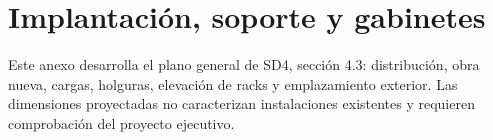 \renewcommand{\thechapter}{A4.4}
\chapter{Implantación, soporte y gabinetes}
Este anexo desarrolla el plano general de SD4, sección 4.3: distribución, obra nueva, cargas, holguras, elevación de racks y emplazamiento exterior. Las dimensiones proyectadas no caracterizan instalaciones existentes y requieren comprobación del proyecto ejecutivo.



